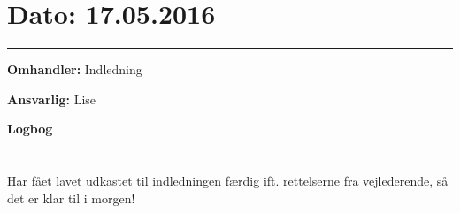 
\section{Dato: 17.05.2016}
\hrule

\textbf{Omhandler:} Indledning

\textbf{Ansvarlig:} Lise

\textbf{Logbog}
\\
\\ \\
Har fået lavet udkastet til indledningen færdig ift. rettelserne fra vejlederende, så det er klar til i morgen! 



